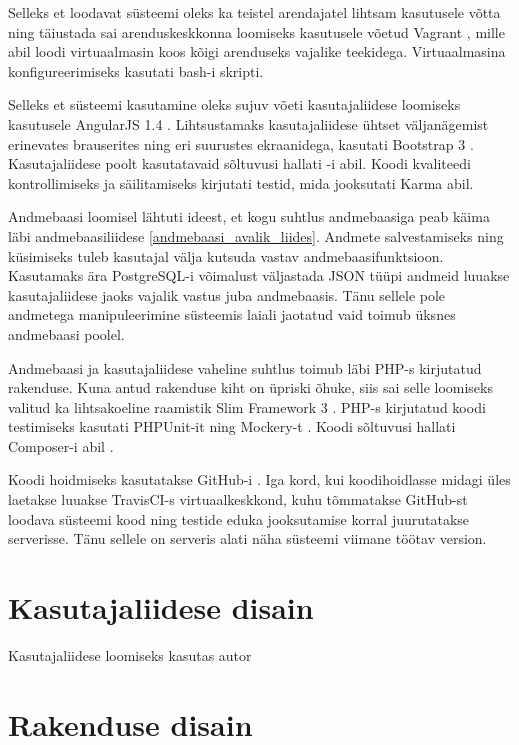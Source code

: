 \documentclass[a4paper,12pt]{article} %
\begin{document}
Selleks et loodavat süsteemi oleks ka teistel arendajatel lihtsam kasutusele võtta ning täiustada sai arenduskeskkonna loomiseks kasutusele võetud Vagrant \cite{Vagrant}, mille abil loodi virtuaalmasin koos kõigi arenduseks vajalike teekidega. Virtuaalmasina konfigureerimiseks kasutati bash-i skripti.\par

Selleks et süsteemi kasutamine oleks sujuv võeti kasutajaliidese loomiseks kasutusele AngularJS 1.4 \cite{AngularJS}. Lihtsustamaks kasutajaliidese ühtset väljanägemist erinevates brauserites ning eri suurustes ekraanidega, kasutati Bootstrap 3 \cite{Bootstrap}. Kasutajaliidese poolt kasutatavaid sõltuvusi hallati \cite{Bower}-i abil. Koodi kvaliteedi kontrollimiseks ja säilitamiseks kirjutati testid, mida jooksutati Karma \cite{Karma} abil.\par

Andmebaasi loomisel lähtuti ideest, et kogu suhtlus andmebaasiga peab käima läbi andmebaasiliidese \ref{andmebaasi_avalik_liides}. Andmete salvestamiseks ning küsimiseks tuleb kasutajal välja kutsuda vastav andmebaasifunktsioon. Kasutamaks ära PostgreSQL-i võimalust väljastada JSON tüüpi andmeid luuakse kasutajaliidese jaoks vajalik vastus juba andmebaasis. Tänu sellele pole andmetega manipuleerimine süsteemis laiali jaotatud vaid toimub üksnes andmebaasi poolel.\par

Andmebaasi ja kasutajaliidese vaheline suhtlus toimub läbi PHP-s \cite{PHP} kirjutatud rakenduse. Kuna antud rakenduse kiht on üpriski õhuke, siis sai selle loomiseks valitud ka lihtsakoeline raamistik Slim Framework 3 \cite{SlimFW}. PHP-s kirjutatud koodi testimiseks kasutati PHPUnit-it \cite{PHPUnit} ning Mockery-t \cite{Mockery}. Koodi sõltuvusi hallati Composer-i abil \cite{Composer}. \par

Koodi hoidmiseks kasutatakse GitHub-i \cite{GitHub}. Iga kord, kui koodihoidlasse midagi üles laetakse luuakse TravisCI-s \cite{TravisCI} virtuaalkeskkond, kuhu tõmmatakse GitHub-st loodava süsteemi kood ning testide eduka jooksutamise korral juurutatakse serverisse. Tänu sellele on serveris alati näha süsteemi viimane töötav version.

\section{Kasutajaliidese disain}
Kasutajaliidese loomiseks kasutas autor 
\section{Rakenduse disain}
\end{document}
